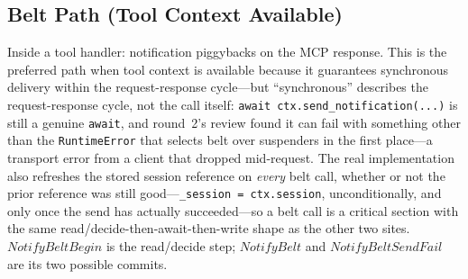 \documentclass[a4paper,10pt,fleqn]{article}
\begin{document}
\subsection{Belt Path (Tool Context Available)}
\label{sec:beltpath}

Inside a tool handler: notification piggybacks on the MCP response.
This is the preferred path when tool context is available because it
guarantees synchronous delivery within the request-response cycle---but
``synchronous'' describes the request-response cycle, not the call
itself: \texttt{await ctx.send\_notification(...)} is still a genuine
\texttt{await}, and round~2's review found it can fail with something
other than the \texttt{RuntimeError} that selects belt over suspenders
in the first place---a transport error from a client that dropped mid-request.
The real implementation also refreshes the stored session reference on
\emph{every} belt call, whether or not the prior reference was still
good---\texttt{\_session = ctx.session}, unconditionally, and only once
the send has actually succeeded---so a belt call is a critical section
with the same read/decide-then-await-then-write shape as the other two
sites.  $NotifyBeltBegin$ is the read/decide step; $NotifyBelt$ and
$NotifyBeltSendFail$ are its two possible commits.
\end{document}
